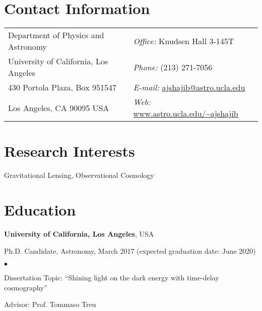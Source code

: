 \documentclass[margin,line]{res}
\newenvironment{list1}{
  \begin{list}{\ding{113}}{%
      \setlength{\itemsep}{0in}
      \setlength{\parsep}{0in} \setlength{\parskip}{0in}
      \setlength{\topsep}{0in} \setlength{\partopsep}{0in} 
      \setlength{\leftmargin}{0.17in}}}{\end{list}}
\newenvironment{list2}{
  \begin{list}{$\bullet$}{%
      \setlength{\itemsep}{0in}
      \setlength{\parsep}{0in} \setlength{\parskip}{0in}
      \setlength{\topsep}{0in} \setlength{\partopsep}{0in} 
      \setlength{\leftmargin}{0.2in}}}{\end{list}}
\begin{document}

\begin{resume}
\section{\sc Contact Information}
\vspace{.05in}
\begin{tabular}{@{}p{3in}p{3in}}                  
Department of Physics and Astronomy    & {\it Office:} Knudsen Hall 3-145T   \\     
University of California, Los Angeles  & {\it Phone:}  (213) 271-7056 \\     
430 Portola Plaza, Box 951547 				         & {\it E-mail:}  \href{mailto:ajshajib@astro.ucla.edu}{ajshajib@astro.ucla.edu} \\
Los Angeles, CA 90095 USA  & {\it Web:} \url{www.astro.ucla.edu/~ajshajib} \\   
\end{tabular}


\section{\sc Research Interests}
Gravitational Lensing, Observational Cosmology

\section{\sc Education}
{\bf University of California, Los Angeles}, USA\\
\vspace*{-.1in}
\begin{list1}
	\item[] Ph.D. Candidate, Astronomy, March 2017 (expected
  	graduation date: June 2020)
	\begin{list2}
		\vspace*{.05in}
		\item Dissertation Topic:  ``Shining light on the dark energy with time-delay cosmography'' 
		\item Advisor:  Prof. Tommaso Treu
	\end{list2}
\end{list1}
\vspace*{.05in}


\end{resume}
\end{document}
